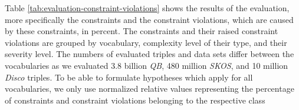 \documentclass{llncs}
\newcommand{\tb}[1]{\todo[size=\small, color=green!40]{\textbf{Thomas:} #1}}
\begin{document}
Table \ref{tab:evaluation-constraint-violations} shows the results of the evaluation, more specifically the constraints and the constraint violations, which are caused by these constraints, in percent.
The constraints and their raised constraint violations are grouped by vocabulary, complexity level of their type, and their severity level.
The numbers of evaluated triples and data sets differ between the vocabularies
as we evaluated 3.8 billion \emph{QB}, 480 million \emph{SKOS}, and 10 million \emph{Disco} triples.
To be able to formulate hypotheses which apply for all vocabularies, 
we only use normalized relative values representing the percentage of constraints and constraint violations belonging to the respective class

\end{document}
